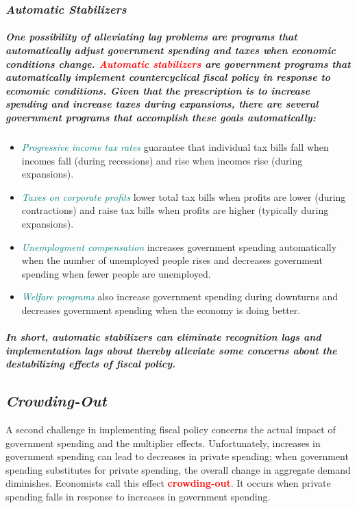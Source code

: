 \documentclass[11pt]{article} %
\begin{document}
\subsubsection*{\textit{Automatic Stabilizers}}
\subparagraph*{One possibility of alleviating lag problems are programs that automatically adjust government spending and taxes when economic conditions change. \textbf{\textcolor{red}{Automatic stabilizers}} are government programs that automatically implement countercyclical fiscal policy in response to economic conditions. Given that the prescription is to increase spending and increase taxes during expansions, there are several government programs that accomplish these goals automatically:}
\begin{itemize}
\item \textit{\textcolor{teal}{Progressive income tax rates}} guarantee that individual tax bills fall when incomes fall (during recessions) and rise when incomes rise (during expansions).
\item \textit{\textcolor{teal}{Taxes on corporate profits}} lower total tax bills when profits are lower (during contractions) and raise tax bills when profits are higher (typically during expansions).
\item \textit{\textcolor{teal}{Unemployment compensation}} increases government spending automatically when the number of unemployed people rises and decreases government spending when fewer people are unemployed.
\item \textit{\textcolor{teal}{Welfare programs}} also increase government spending during downturns and decreases government spending when the economy is doing better.
\end{itemize}
\subparagraph*{In short, automatic stabilizers can eliminate recognition lags and implementation lags about thereby alleviate some concerns about the destabilizing effects of fiscal policy.}

\subsection*{\textit{\textbf{Crowding-Out}}}
A second challenge in implementing fiscal policy concerns the actual impact of government spending and the multiplier effects. Unfortunately, increases in government spending can lead to decreases in private spending; when government spending substitutes for private spending, the overall change in aggregate demand diminishes. Economists call this effect \textbf{\textcolor{red}{crowding-out}}. It occurs when private spending falls in response to increases in government spending.
\end{document}
